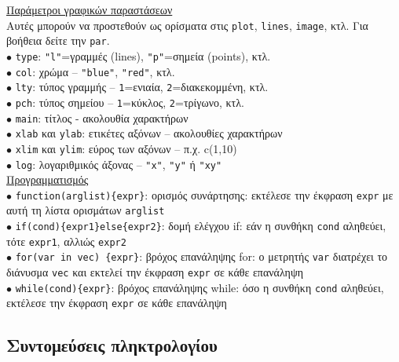 \documentclass[a4paper,10pt,twocolumn]{article}
\begin{document}
\noindent \underline{Παράμετροι γραφικών παραστάσεων}\vspace{0.2cm}\\
Αυτές μπορούν να προστεθούν ως ορίσματα στις \texttt{plot}, \texttt{lines}, \texttt{image}, κτλ. Για βοήθεια
δείτε την \texttt{par}.\\
$\bullet$ \texttt{type}: \texttt{"l"}=γραμμές (lines), \texttt{"p"}=σημεία (points), κτλ.\\
$\bullet$ \texttt{col}: χρώμα -- \texttt{"blue"}, \texttt{"red"}, κτλ.\\
$\bullet$ \texttt{lty}: τύπος γραμμής -- \texttt{1}=ενιαία, \texttt{2}=διακεκομμένη, κτλ.\\
$\bullet$ \texttt{pch}: τύπος σημείου -- \texttt{1}=κύκλος, \texttt{2}=τρίγωνο, κτλ.\\
$\bullet$ \texttt{main}: τίτλος - ακολουθία χαρακτήρων\\
$\bullet$ \texttt{xlab} και \texttt{ylab}: ετικέτες αξόνων -- ακολουθίες χαρακτήρων\\
$\bullet$ \texttt{xlim} και \texttt{ylim}: εύρος των αξόνων -- π.χ. c(1,10)\\ 
$\bullet$ \texttt{log}: λογαριθμικός άξονας -- \texttt{"x"}, \texttt{"y"} ή \texttt{"xy"}\\

\noindent \underline{Προγραμματισμός}\vspace{0.2cm}\\
$\bullet$ \verb!function(arglist){expr}!: ορισμός συνάρτησης: εκτέλεσε την έκφραση \texttt{expr} με αυτή τη
λίστα ορισμάτων \texttt{arglist} \\ 
$\bullet$ \verb!if(cond){expr1}else{expr2}!: δομή ελέγχου if: εάν η συνθήκη \texttt{cond} αληθεύει, τότε
\texttt{expr1}, αλλιώς \texttt{expr2} \\
$\bullet$ \verb!for(var in vec) {expr}!: βρόχος επανάληψης for: ο μετρητής \texttt{var} διατρέχει το διάνυσμα
\texttt{vec} και εκτελεί την έκφραση \texttt{expr} σε κάθε επανάληψη \\
$\bullet$ \verb!while(cond){expr}!: βρόχος επανάληψης while: όσο η συνθήκη \texttt{cond} αληθεύει, εκτέλεσε
την έκφραση \texttt{expr} σε κάθε επανάληψη \\

\subsection{Συντομεύσεις πληκτρολογίου}
\end{document}
